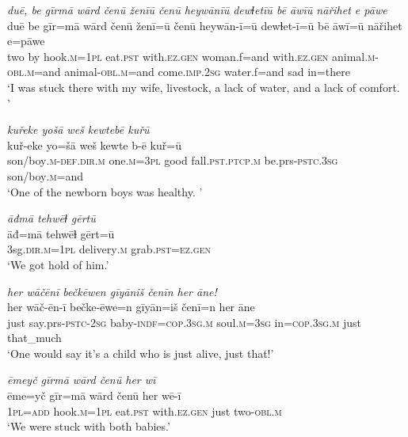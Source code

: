 \ea \label{ZQ.16}
\textit{duē, be gīrmā wārd čenū ženīū čenū heywānīū dewɫetīū bē āwīū nāřihet e pāwe} \\ 
\gll duē be gīr=mā wārd čenū ženī=ū čenū heywān-ī=ū dewɫet-ī=ū bē āwī=ū nāřihet e=pāwe \\ 
 two by hook\textsc{.m}\textsc{=\textsc{1pl}} eat\textsc{.pst} with\textsc{.ez.gen} woman.f=and with\textsc{.ez.gen} animal\textsc{.m}\textsc{-obl}\textsc{.m}=and animal\textsc{-obl}\textsc{.m}=and come\textsc{.imp}\textsc{.\textsc{2sg}} water.f=and sad in=there \\ 
\glt `I was stuck there with my wife, livestock, a lack of water, and a lack of comfort. '
\z 
 
\ea \label{ZQ.17}
\textit{kuřeke yošā weš kewtebē kuřū} \\ 
\gll kuř-eke yo=šā weš kewte b-ē kuř=ū \\ 
 son/boy\textsc{.m}\textsc{-def}\textsc{.dir}\textsc{.m} one\textsc{.m}\textsc{=3pl} good fall\textsc{.pst}\textsc{.ptcp}\textsc{.m} be.prs\textsc{-pstc}\textsc{.3sg} son/boy\textsc{.m}=and \\ 
\glt `One of the newborn boys was healthy. '
\z 
 
\ea \label{ZQ.18}
\textit{āđmā tehwēɫ gērtū} \\ 
\gll āđ=mā tehwēɫ gērt=ū \\ 
 3sg\textsc{.dir}\textsc{.m}\textsc{=\textsc{1pl}} delivery\textsc{.m} grab\textsc{.pst}\textsc{=ez.gen} \\ 
\glt `We got hold of him.'
\z 
 
\ea \label{ZQ.20}
\textit{her wāčēnī bečkēwen gīyāniš čenīn her āne!} \\ 
\gll her wāč-ēn-ī bečke-ēwe=n gīyān=iš čenī=n her āne \\ 
 just say.prs\textsc{-pstc}-\textsc{2sg} baby\textsc{-indf}\textsc{=cop}\textsc{.3sg}\textsc{.m} soul\textsc{.m}\textsc{=3sg} in\textsc{=cop}\textsc{.3sg}\textsc{.m} just that\_much \\ 
\glt `One would say it’s a child who is just alive, just that!'
\z 
 
\ea \label{ZQ.21}
\textit{ēmeyč gīrmā wārd čenū her wī} \\ 
\gll ēme=yč gīr=mā wārd čenū her wē-ī \\ 
 \textsc{1pl}\textsc{=add} hook\textsc{.m}\textsc{=\textsc{1pl}} eat\textsc{.pst} with\textsc{.ez.gen} just two\textsc{-obl}\textsc{.m} \\ 
\glt `We were stuck with both babies.'
\z 
 
